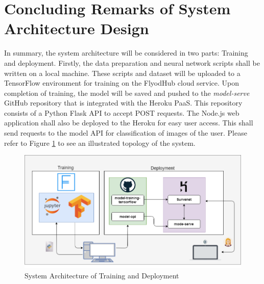 \section{Concluding Remarks of System Architecture Design}
In summary, the system architecture will be considered in two parts: Training and deployment. Firstly, the data preparation and neural network scripts shall be written on a local machine. These scripts and dataset will be uploaded to a TensorFlow environment for training on the FlyodHub cloud service. Upon completion of training, the model will be saved and pushed to the \textit{model-serve} GitHub repository that is integrated with the Heroku PaaS. This repository consists of a Python Flask API to accept POST requests. The Node.js web application shall also be deployed to the Heroku for easy user access. This shall send requests to the model API for classification of images of the user. Please refer to Figure \ref{arch} to see an illustrated topology of the system.
\begin{figure}[ht]
	\begin{center}
		\advance\leftskip-3cm
		\advance\rightskip-3cm
		\includegraphics[keepaspectratio=true,scale=0.5]{__resources/Design/arch.png}
		\caption{System Architecture of Training and Deployment}
		\label{arch}
	\end{center}
\end{figure}

